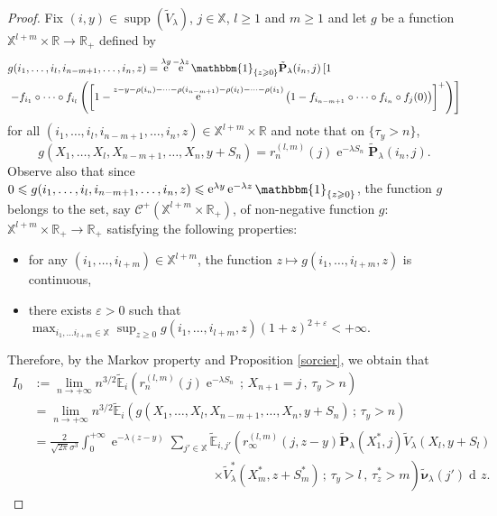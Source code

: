 \documentclass[12pt]{amsart}
\theoremstyle{definition}
\numberwithin{equation}{section}
\def\bb#1{\mathbb{#1}}
\def\scr#1{\mathscr{#1}}
\def\bbm#1{\mathbbm{#1}}
\def\tt#1{\tilde{#1}}
\def\tbf#1{\tilde{\mathbf{#1}}}
\def\tbs#1{\tilde{\boldsymbol{#1}}}
\def\tbb#1{\tilde{\mathbb{#1}}}
\def\geq{\geqslant}
\def\leq{\leqslant}
\newcommand\ee{\varepsilon}
\renewcommand\ll{\lambda}
\DeclareMathOperator{\dd}{d\!}
\DeclareMathOperator{\e}{e}
\DeclareMathOperator{\supp}{supp}
\begin{document}
\begin{proof}
Fix $(i,y) \in \supp\left( \tt V_{\ll} \right)$, $j \in \bb X$, $l\geq 1$ and $m \geq 1$ and let $g$ be a function $\bb X^{l+m} \times \bb R \to \bb R_+$ defined by
\begin{align*}
&g(i_1, \dots, i_l,i_{n-m+1},\dots, i_n, z) = \e^{\ll y} \e^{-\ll z} \bbm 1_{\{ z \geq 0 \}} \tbf P_{\ll}(i_n,j) \left[ 1 \right. \\
&\left. -f_{i_1} \circ \cdots \circ f_{i_l} \left( \left[ 1- \e^{z-y-\rho(i_n)-\cdots-\rho(i_{n-m+1})-\rho(i_l)-\dots-\rho(i_1)} \left( 1-f_{i_{n-m+1}}\circ \cdots \circ f_{i_n} \circ f_j (0) \right) \right]^+ \right) \right]
\end{align*}
for all $(i_1, \dots, i_l,i_{n-m+1},\dots, i_n, z) \in \bb X^{l+m} \times \bb R $ and note that on $\{ \tau_y > n \}$,
\[
g(X_1,\dots,X_l,X_{n-m+1},\dots,X_n,y+S_n) = r_n^{(l,m)}(j) \e^{-\ll S_n} \tbf P_{\ll}(i_n,j).
\]
Observe also that since $0 \leq g(i_1, \dots, i_l,i_{n-m+1},\dots, i_n, z) \leq \e^{\ll y} \e^{-\ll z} \bbm 1_{\{ z \geq 0 \}}$, the function $g$ belongs to the set, say $\scr C^+ \left( \bb X^{l+m} \times \bb R_+ \right)$, of non-negative function $g$: $\bb X^{l+m} \times \bb R_+ \to \bb R_+$ satisfying the following properties:
\begin{itemize}
\item for any $(i_1,\dots,i_{l+m}) \in \bb X^{l+m}$, the function $z \mapsto g(i_1,\dots,i_{l+m},z)$ is continuous,
\item there exists $\ee >0$ such that $\max_{i_1,\dots i_{l+m} \in \bb X} \sup_{z\geq 0} g(i_1,\dots,i_{l+m},z) (1+z)^{2+\ee} < +\infty$.
\end{itemize}
Therefore, by the Markov property and Proposition \ref{sorcier}, 
we obtain that
\begin{align*}
I_0 &:= \lim_{n\to +\infty} n^{3/2} \tbb E_i \left( r_n^{(l,m)}(j) \e^{-\ll S_n} \,;\, X_{n+1} = j \,,\, \tau_y > n \right) \\
&= \lim_{n\to +\infty} n^{3/2} \tbb E_i \left( g \left(X_1, \dots, X_l, X_{n-m+1}, \dots, X_n, y+S_n \right) \,;\, \tau_y > n \right) \\
&= \frac{2}{\sqrt{2\pi} \sigma^3} \int_0^{+\infty} \e^{-\ll (z-y)} \sum_{j' \in \bb X} \tbb E_{i,j'} \left( r_{\infty}^{(l,m)}(j,z-y) \tbf P_{\ll}(X_1^*,j) \tt V_{\ll}\left( X_l,y+S_l \right) \right. \\
&\hspace{6cm} \left. \times \tt V_{\ll}^* \left( X_m^*, z+S_m^* \right) \,;\, \tau_y > l \,,\, \tau_z^* > m \right) \tbs \nu_{\ll}(j') \dd z.

\end{align*}
\end{proof}
\end{document}
